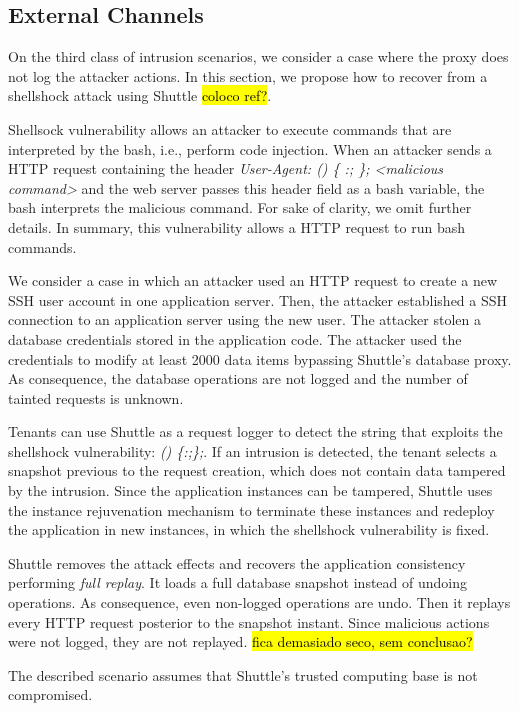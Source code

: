 \subsection{External Channels}\label{sec:eval:accuracy:external}
On the third class of intrusion scenarios, we consider a case where the proxy does not log the attacker actions. In this section, we propose how to recover from a shellshock attack using Shuttle \hl{coloco ref?}. 

Shellsock vulnerability allows an attacker to execute commands that are interpreted by the bash, i.e., perform code injection. When an attacker sends a \ac{HTTP} request containing the header \emph{User-Agent: () \{ :; \}; <malicious command>} and the web server passes this header field as a bash variable, the bash interprets the malicious command. For sake of clarity, we omit further details. In summary, this vulnerability allows a \ac{HTTP} request to run bash commands.

We consider a case in which an attacker used an \ac{HTTP} request to create a new \ac{SSH} user account in one application server. Then, the attacker established a \ac{SSH} connection to an application server using the new user. The attacker stolen a database credentials stored in the application code. The attacker used the credentials to modify at least 2000 data items bypassing Shuttle's database proxy. As consequence, the database operations are not logged and the number of tainted requests is unknown.

Tenants can use Shuttle as a request logger to detect the string that exploits the shellshock vulnerability: \emph{() \{:;\};}. If an intrusion is detected, the tenant selects a snapshot previous to the request creation, which does not contain data tampered by the intrusion. Since the application instances can be tampered, Shuttle uses the instance rejuvenation mechanism to terminate these instances and redeploy the application in new instances, in which the shellshock vulnerability is fixed.

Shuttle removes the attack effects and recovers the application consistency performing \emph{full replay}. It loads a full database snapshot instead of undoing operations. As consequence, even non-logged operations are undo. Then it replays every HTTP request posterior to the snapshot instant. Since malicious actions were not logged, they are not replayed. \hl{fica demasiado seco, sem conclusao?}

The described scenario assumes that Shuttle's trusted computing base is not compromised.

